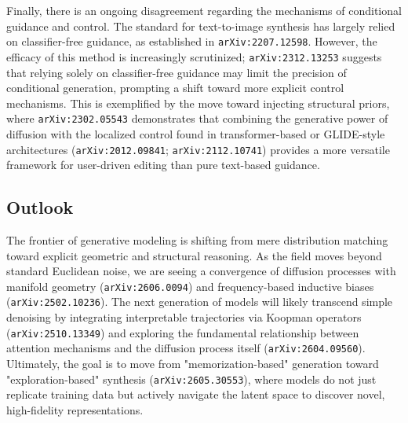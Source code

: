 \documentclass[11pt]{article}
\begin{document}
Finally, there is an ongoing disagreement regarding the mechanisms of conditional guidance and control. The standard for text-to-image synthesis has largely relied on classifier-free guidance, as established in \texttt{arXiv:2207.12598}. However, the efficacy of this method is increasingly scrutinized; \texttt{arXiv:2312.13253} suggests that relying solely on classifier-free guidance may limit the precision of conditional generation, prompting a shift toward more explicit control mechanisms. This is exemplified by the move toward injecting structural priors, where \texttt{arXiv:2302.05543} demonstrates that combining the generative power of diffusion with the localized control found in transformer-based or GLIDE-style architectures (\texttt{arXiv:2012.09841}; \texttt{arXiv:2112.10741}) provides a more versatile framework for user-driven editing than pure text-based guidance.

\subsection{Outlook}

The frontier of generative modeling is shifting from mere distribution matching toward explicit geometric and structural reasoning. As the field moves beyond standard Euclidean noise, we are seeing a convergence of diffusion processes with manifold geometry (\texttt{arXiv:2606.0094}) and frequency-based inductive biases (\texttt{arXiv:2502.10236}). The next generation of models will likely transcend simple denoising by integrating interpretable trajectories via Koopman operators (\texttt{arXiv:2510.13349}) and exploring the fundamental relationship between attention mechanisms and the diffusion process itself (\texttt{arXiv:2604.09560}). Ultimately, the goal is to move from "memorization-based" generation toward "exploration-based" synthesis (\texttt{arXiv:2605.30553}), where models do not just replicate training data but actively navigate the latent space to discover novel, high-fidelity representations.
\end{document}
